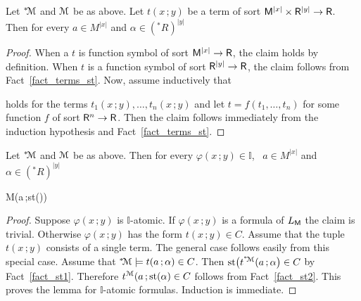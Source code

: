 \documentclass[10pt,oneside]{amsproc}
\begin{document}
\begin{fact}\label{fact_st2}
  Let ${}^*{\!\EuScript M}$ and ${\EuScript M}$ be as above.
  Let $t(x\,;y)$ be a term of sort ${\sf M}^{|x|}\times{\sf R}^{|y|}\to {\sf R}$.
  Then for every $a\in M^{|x|}$ and $\alpha\in({}^*\!R)^{|y|}$

\end{fact}
\begin{proof}
  When a $t$ is function symbol of sort  ${\sf M}^{|x|}\to {\sf R}$, the claim holds by definition.
  When $t$ is a function symbol of sort ${\sf R}^{|y|}\to {\sf R}$, the claim follows from Fact~\ref{fact_terms_st}.
  Now, assume inductively that 


  holds for the terms $t_1(x\,;y),\dots,t_n(x\,;y)$ and let $t=f(t_1,\dots,t_n)$ for some function $f$ of sort ${\sf R}^n\to {\sf R}$.
  Then the claim follows immediately from the induction hypothesis and Fact~\ref{fact_terms_st}.
\end{proof}


\begin{lemma}\label{lem_st}
  Let ${}^*{\!\EuScript M}$ and ${\EuScript M}$ be as above.
  Then for every $\varphi(x\,;y)\in\mathds{I}$, \  $a\in M^{|x|}$ and $\alpha\in({}^*\!R)^{|y|}$ 
  
  {\Rightarrow}
  {{\EuScript M}\models\varphi\big(a\,;{\rm st}(\alpha)\big)}
\end{lemma}

\begin{proof}
  Suppose $\varphi(x\,;y)$ is $\mathds{I}$-atomic.
  If $\varphi(x\,;y)$ is a formula of $L_{\sf M}$ the claim is trivial. 
  Otherwise $\varphi(x\,;y)$ has the form $t(x\,;y)\in C$.
  Assume that the tuple $t(x\,;y)$ consists of a single term.
  The general case follows easily from this special case. 
  Assume that ${}^*{\!\EuScript M}\models t(a\,;\alpha)\in C$.
  Then ${\rm st}\big(t^{{}^*{\!\EuScript M}}(a\,;\alpha\big)\in C$ by Fact~\ref{fact_st1}.
  Therefore $t^{{\EuScript M}}(a\,;{\rm st}(\alpha)\in C$ follows from Fact~\ref{fact_st2}.
  This proves the lemma for $\mathds{I}$-atomic formulas.
  Induction is immediate. 
\end{proof}
\end{document}
